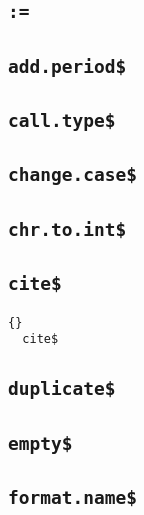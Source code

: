 \subsection{\texttt{:=}}

\INCOMPLETE

\subsection{\texttt{add.period\$}}

\INCOMPLETE

\subsection{\texttt{call.type\$}}

\INCOMPLETE

\subsection{\texttt{change.case\$}}

\INCOMPLETE

\subsection{\texttt{chr.to.int\$}}

\INCOMPLETE

\subsection{\texttt{cite\$}}

\begin{lstlisting}{}
  cite$
\end{lstlisting}

\INCOMPLETE

\subsection{\texttt{duplicate\$}}

\INCOMPLETE

\subsection{\texttt{empty\$}}

\INCOMPLETE

\subsection{\texttt{format.name\$}}

